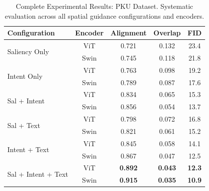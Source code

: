 \documentclass[journal,article,submit,pdftex,moreauthors]{Definitions/mdpi}
\begin{document}
\begin{table}[H]
\caption{Complete Experimental Results: PKU Dataset. Systematic evaluation across all spatial guidance configurations and encoders.\label{tab:pku_complete_results}}
\begin{tabularx}{\textwidth}{lcccc}
\toprule
\textbf{Configuration} & \textbf{Encoder} & \textbf{Alignment} & \textbf{Overlap} & \textbf{FID}\\
\midrule
\multirow{2}{*}{Saliency Only} & ViT & 0.721 & 0.132 & 23.4\\
 & Swin & 0.745 & 0.118 & 21.8\\
\midrule
\multirow{2}{*}{Intent Only} & ViT & 0.763 & 0.098 & 19.2\\
 & Swin & 0.789 & 0.087 & 17.6\\
\midrule
\multirow{2}{*}{Sal + Intent} & ViT & 0.834 & 0.065 & 15.3\\
 & Swin & 0.856 & 0.054 & 13.7\\
\midrule
\multirow{2}{*}{Sal + Text} & ViT & 0.798 & 0.072 & 16.8\\
 & Swin & 0.821 & 0.061 & 15.2\\
\midrule
\multirow{2}{*}{Intent + Text} & ViT & 0.845 & 0.058 & 14.1\\
 & Swin & 0.867 & 0.047 & 12.5\\
\midrule
\multirow{2}{*}{Sal + Intent + Text} & ViT & \textbf{0.892} & \textbf{0.043} & \textbf{12.3}\\
 & Swin & \textbf{0.915} & \textbf{0.035} & \textbf{10.9}\\
\bottomrule
\end{tabularx}
\end{table}
\end{document}
